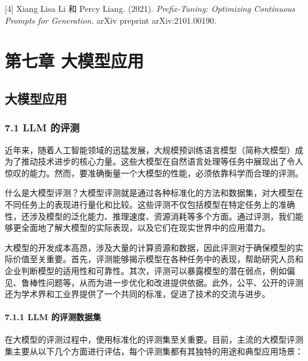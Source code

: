 \documentclass[12pt,a4paper]{book}
\begin{document}
{[}4{]} Xiang Lisa Li 和 Percy Liang. (2021). \emph{Prefix-Tuning:
Optimizing Continuous Prompts for Generation.} arXiv preprint
arXiv:2101.00190.

\chapter{第七章 大模型应用}
{
\setcounter{tocdepth}{3}
\tableofcontents
}
\section{大模型应用}\label{ux5927ux6a21ux578bux5e94ux7528}

\subsection{7.1 LLM 的评测}\label{llm-ux7684ux8bc4ux6d4b}

近年来，随着人工智能领域的迅猛发展，大规模预训练语言模型（简称大模型）成为了推动技术进步的核心力量。这些大模型在自然语言处理等任务中展现出了令人惊叹的能力。然而，要准确衡量一个大模型的性能，必须依靠科学而合理的评测。

什么是大模型评测？大模型评测就是通过各种标准化的方法和数据集，对大模型在不同任务上的表现进行量化和比较。这些评测不仅包括模型在特定任务上的准确性，还涉及模型的泛化能力、推理速度、资源消耗等多个方面。通过评测，我们能够更全面地了解大模型的实际表现，以及它们在现实世界中的应用潜力。

大模型的开发成本高昂，涉及大量的计算资源和数据，因此评测对于确保模型的实际价值至关重要。首先，评测能够揭示模型在各种任务中的表现，帮助研究人员和企业判断模型的适用性和可靠性。其次，评测可以暴露模型的潜在弱点，例如偏见、鲁棒性问题等，从而为进一步优化和改进提供依据。此外，公平、公开的评测还为学术界和工业界提供了一个共同的标准，促进了技术的交流与进步。

\subsubsection{7.1.1 LLM
的评测数据集}\label{llm-ux7684ux8bc4ux6d4bux6570ux636eux96c6}

在大模型的评测过程中，使用标准化的评测集至关重要。目前，主流的大模型评测集主要从以下几个方面进行评估，每个评测集都有其独特的用途和典型应用场景：
\end{document}

